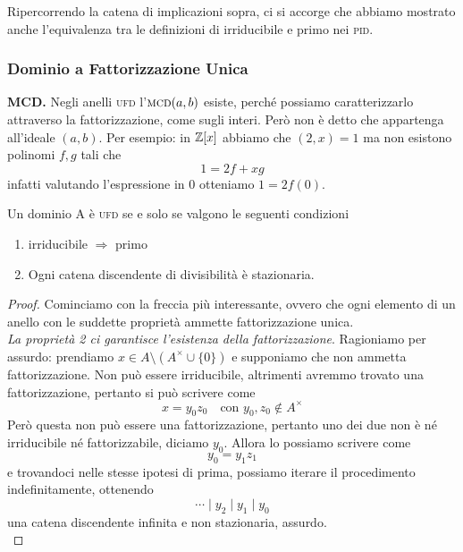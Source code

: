 \begin{multicols}{2}
\begin{remark}
	Ripercorrendo la catena di implicazioni sopra, ci si accorge che abbiamo mostrato anche l'equivalenza tra le definizioni di irriducibile e primo  nei \textsc{pid}.
\end{remark}

\subsubsection{Dominio a Fattorizzazione Unica}

\textbf{MCD.} Negli anelli \textsc{ufd} l'$ \textsc{mcd}(a, b) $ esiste, perché possiamo caratterizzarlo attraverso la fattorizzazione, come sugli interi. Però non è detto che appartenga all'ideale $ (a, b) $. Per esempio: in $ \mathbb{Z}[x] $ abbiamo che $ (2, x) = 1 $ ma non esistono polinomi $ f, g $ tali che
\[ 1 = 2f + xg \]
infatti valutando l'espressione in $ 0 $ otteniamo $ 1 = 2f(0) $.

\begin{theorem} \label{carufd}
	Un dominio A è \textsc{ufd} se e solo se valgono le seguenti condizioni
	\begin{enumerate}
		\item irriducibile $ \Rightarrow $ primo
		\item Ogni catena discendente di divisibilità è stazionaria.
	\end{enumerate}
\end{theorem}

\begin{proof}
	Cominciamo con la freccia più interessante, ovvero che ogni elemento di un anello con le suddette proprietà ammette fattorizzazione unica. \\
	
	\emph{La proprietà 2 ci garantisce l'esistenza della fattorizzazione}. Ragioniamo per assurdo: prendiamo $ x \in A\setminus(A^\times \cup \{0\}) $ e supponiamo che non ammetta fattorizzazione. Non può essere irriducibile, altrimenti avremmo trovato una fattorizzazione, pertanto si può scrivere come
	\[ x = y_0z_0 \quad\text{con } y_0, z_0 \notin A^\times \]
	Però questa non può essere una fattorizzazione, pertanto uno dei due non è né irriducibile né fattorizzabile, diciamo $ y_0 $. Allora lo possiamo scrivere come
	\[ y_0 = y_1 z_1 \]
	e trovandoci nelle stesse ipotesi di prima, possiamo iterare il procedimento indefinitamente, ottenendo
	\[ \cdots \mid y_2 \mid y_1 \mid y_0 \]
	una catena discendente infinita e non stazionaria, assurdo.\\
	

\end{proof}
\end{multicols}

